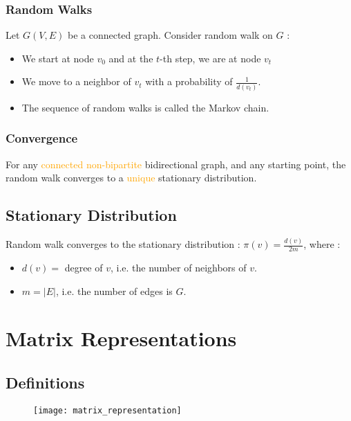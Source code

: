 \subsubsection{Random Walks}

Let $G(V, E)$ be a connected graph. Consider random walk on $G$ :
\begin{itemize}
\item We start at node $v_0$ and at the $t$-th step, we are at node $v_t$
\item We move to a neighbor of $v_t$ with a probability of $\frac{1}{d(v_t)}$.
\item The sequence of random walks is called the Markov chain.
\end{itemize}

\subsubsection{Convergence}

For any \textcolor{orange}{connected non-bipartite} bidirectional graph, and any starting point, the random walk converges to a \textcolor{orange}{unique} stationary distribution.

\subsection{Stationary Distribution}

Random walk converges to the stationary distribution :
$\pi(v) = \frac{d(v)}{2m}$, where :
\begin{itemize}
\item $d(v) =$ degree of $v$, i.e. the number of neighbors of $v$.
\item $m = |E|$, i.e. the number of edges is $G$.
\end{itemize}

\section{Matrix Representations}

\subsection{Definitions}

\begin{figure}[H]
    \centering
    \texttt{[image: matrix\_representation]}
\end{figure}

